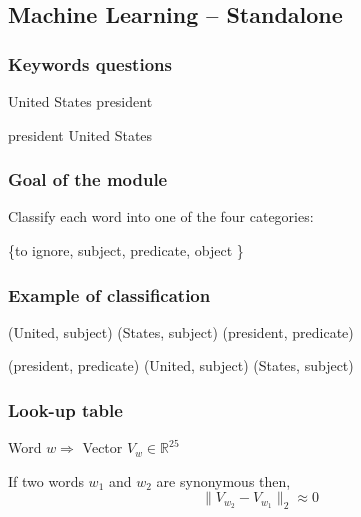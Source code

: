 \subsection{Machine Learning \--- Standalone}

\begin{frame}[fragile]
  \frametitle{Keywords questions}

	
	\begin{center}
  	\alert{United States president}
	\end{center}

	\begin{center}
  	\alert{president United States}
	\end{center}

\end{frame}

\begin{frame}[fragile]
\frametitle{Goal of the module}

Classify each word into one of the four categories: \newline
\begin{center}
 \{to ignore, subject, predicate, object \}
\end{center}

\end{frame}

\begin{frame}[fragile]
	\frametitle{Example of classification}

	\begin{center}
  	\alert{(United, subject) (States, subject) (president, predicate)}
	\end{center}

	\begin{center}
  	\alert{(president, predicate) (United, subject) (States, subject)}
	\end{center}



\end{frame}

\begin{frame}[fragile]
  \frametitle{Look-up table}

	\begin{center}
	Word $w \Rightarrow $ Vector $ V_w \in \mathbb{R}^{25}$
	\end{center}

	\begin{center}
	If two words $w_1$ and $w_2$ are synonymous then, \newline
	$$ \| V_{w_2} - V_{w_1} \|_2 \approx 0 $$
	
	\end{center}



\end{frame}



